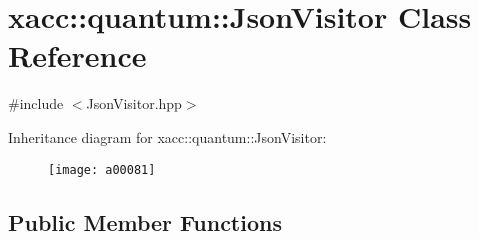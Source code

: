 \hypertarget{a00081}{}\section{xacc\+:\+:quantum\+:\+:Json\+Visitor Class Reference}
\label{a00081}


{\ttfamily \#include $<$Json\+Visitor.\+hpp$>$}

Inheritance diagram for xacc\+:\+:quantum\+:\+:Json\+Visitor\+:\begin{figure}[H]
\begin{center}
\leavevmode
\texttt{[image: a00081]}
\end{center}
\end{figure}
\subsection*{Public Member Functions}
